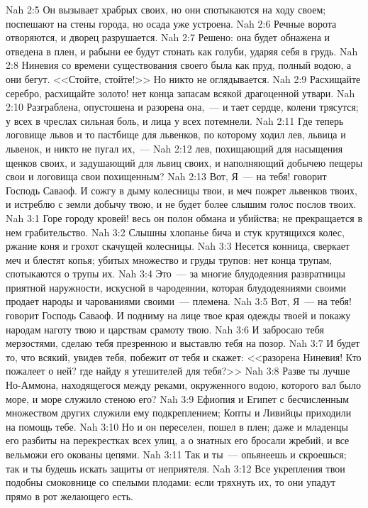 \vs Nah 2:5 Он вызывает храбрых своих, но они спотыкаются на ходу своем; поспешают на стены города, но осада уже устроена.
\vs Nah 2:6 Речные ворота отворяются, и дворец разрушается.
\vs Nah 2:7 Решено: она будет обнажена и отведена в плен, и рабыни ее будут стонать как голуби, ударяя себя в грудь.
\vs Nah 2:8 Ниневия со времени существования своего была как пруд, полный водою, а они бегут. <<Стойте, стойте!>> Но никто не оглядывается.
\vs Nah 2:9 Расхищайте серебро, расхищайте золото! нет конца запасам всякой драгоценной утвари.
\vs Nah 2:10 Разграблена, опустошена и разорена она,~--- и тает сердце, колени трясутся; у всех в чреслах сильная боль, и лица у всех потемнели.
\vs Nah 2:11 Где теперь логовище львов и то пастбище для львенков, по которому ходил лев, львица и львенок, и никто не пугал их,~---
\vs Nah 2:12 лев, похищающий для насыщения щенков своих, и задушающий для львиц своих, и наполняющий добычею пещеры свои и логовища свои похищенным?
\vs Nah 2:13 Вот, Я~--- на тебя! говорит Господь Саваоф. И сожгу в дыму колесницы твои, и меч пожрет львенков твоих, и истреблю с земли добычу твою, и не будет более слышим голос послов твоих.
\vs Nah 3:1 Горе городу кровей! весь он полон обмана и убийства; не прекращается в нем грабительство.
\vs Nah 3:2 Слышны хлопанье бича и стук крутящихся колес, ржание коня и грохот скачущей колесницы.
\vs Nah 3:3 Несется конница, сверкает меч и блестят копья; убитых множество и груды трупов: нет конца трупам, спотыкаются о трупы их.
\vs Nah 3:4 Это~--- за многие блудодеяния развратницы приятной наружности, искусной в чародеянии, которая блудодеяниями своими продает народы и чарованиями своими~--- племена.
\vs Nah 3:5 Вот, Я~--- на тебя! говорит Господь Саваоф. И подниму на лице твое края одежды твоей и покажу народам наготу твою и царствам срамоту твою.
\vs Nah 3:6 И забросаю тебя мерзостями, сделаю тебя презренною и выставлю тебя на позор.
\vs Nah 3:7 И будет то, что всякий, увидев тебя, побежит от тебя и скажет: <<разорена Ниневия! Кто пожалеет о ней? где найду я утешителей для тебя?>>
\vs Nah 3:8 Разве ты лучше Но-Аммона, находящегося между реками, окруженного водою, которого вал было море, и море служило стеною его?
\vs Nah 3:9 Ефиопия и Египет с бесчисленным множеством других служили ему подкреплением; Копты и Ливийцы приходили на помощь тебе.
\vs Nah 3:10 Но и он переселен, пошел в плен; даже и младенцы его разбиты на перекрестках всех улиц, а о знатных его бросали жребий, и все вельможи его окованы цепями.
\vs Nah 3:11 Так и ты~--- опьянеешь и скроешься; так и ты будешь искать защиты от неприятеля.
\vs Nah 3:12 Все укрепления твои подобны смоковнице со спелыми плодами: если тряхнуть их, то они упадут прямо в рот желающего есть.
